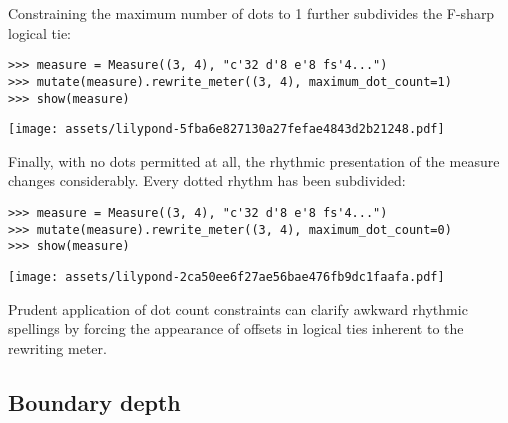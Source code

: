\noindent Constraining the maximum number of dots to 1 further subdivides the
F-sharp logical tie:

\begin{comment}
<abjad>
measure = Measure((3, 4), "c'32 d'8 e'8 fs'4...")
mutate(measure).rewrite_meter((3, 4), maximum_dot_count=1)
show(measure)
</abjad>
\end{comment}

\begin{singlespacing}
\vspace{-0.5\baselineskip}
\begin{lstlisting}
>>> measure = Measure((3, 4), "c'32 d'8 e'8 fs'4...")
>>> mutate(measure).rewrite_meter((3, 4), maximum_dot_count=1)
>>> show(measure)
\end{lstlisting}
\noindent\texttt{[image: assets/lilypond-5fba6e827130a27fefae4843d2b21248.pdf]}
\end{singlespacing}

\noindent Finally, with no dots permitted at all, the rhythmic presentation of
the measure changes considerably. Every dotted rhythm has been subdivided:

\begin{comment}
<abjad>
measure = Measure((3, 4), "c'32 d'8 e'8 fs'4...")
mutate(measure).rewrite_meter((3, 4), maximum_dot_count=0)
show(measure)
</abjad>
\end{comment}

\begin{singlespacing}
\vspace{-0.5\baselineskip}
\begin{lstlisting}
>>> measure = Measure((3, 4), "c'32 d'8 e'8 fs'4...")
>>> mutate(measure).rewrite_meter((3, 4), maximum_dot_count=0)
>>> show(measure)
\end{lstlisting}
\noindent\texttt{[image: assets/lilypond-2ca50ee6f27ae56bae476fb9dc1faafa.pdf]}
\end{singlespacing}

\noindent Prudent application of dot count constraints can clarify awkward
rhythmic spellings by forcing the appearance of offsets in logical ties
inherent to the rewriting meter.

\subsection{Boundary depth} %

